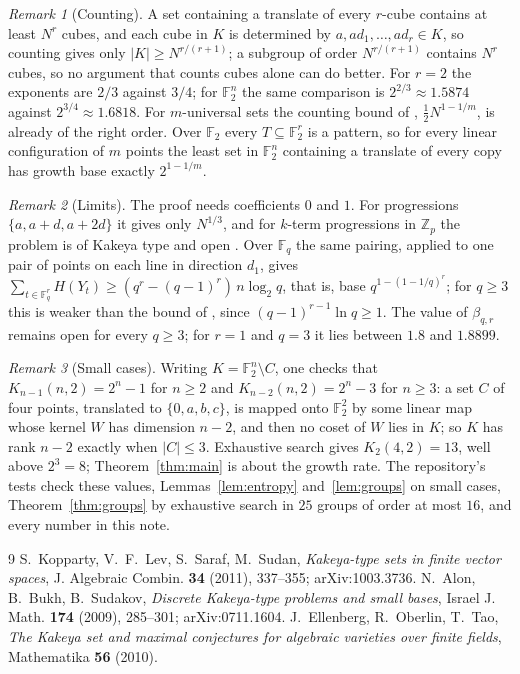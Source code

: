 \documentclass[11pt]{amsart}
\theoremstyle{remark}
\newtheorem*{remark}{Remark}
\newcommand{\F}{\mathbb{F}}
\begin{document}
\begin{remark}[Counting]
A set containing a translate of every $r$-cube contains at least $N^r$ cubes, and each cube in
$K$ is determined by $a,ad_1,\dots,ad_r\in K$, so counting gives only $|K|\ge N^{r/(r+1)}$; a
subgroup of order $N^{r/(r+1)}$ contains $N^r$ cubes, so no argument that counts cubes alone can
do better. For $r=2$ the exponents are $2/3$ against $3/4$; for $\F_2^n$ the same comparison is
$2^{2/3}\approx1.5874$ against $2^{3/4}\approx1.6818$. For $m$-universal sets the counting bound of
\cite{ABS}, $\tfrac12N^{1-1/m}$, is already of the right order. Over $\F_2$ every $T\subseteq\F_2^r$
is a pattern, so for every linear configuration of $m$ points the least set in $\F_2^n$
containing a translate of every copy has growth base exactly $2^{1-1/m}$.
\end{remark}

\begin{remark}[Limits]
The proof needs coefficients $0$ and $1$. For progressions $\{a,a+d,a+2d\}$ it gives only
$N^{1/3}$, and for $k$-term progressions in $\mathbb Z_p$ the problem is of Kakeya type and open
\cite{ABS}. Over $\F_q$ the same pairing, applied to one pair of points on each line in direction
$d_1$, gives $\sum_{t\in\F_q^r}H(Y_t)\ge(q^r-(q-1)^r)\,n\log_2q$, that is, base
$q^{1-(1-1/q)^r}$; for $q\ge3$ this is weaker than the bound of \cite{KLSS}, since
$(q-1)^{r-1}\ln q\ge1$. The value of $\beta_{q,r}$ remains open for every $q\ge3$; for $r=1$ and
$q=3$ it lies between $1.8$ and $1.8899$.
\end{remark}

\begin{remark}[Small cases]
Writing $K=\F_2^n\setminus C$, one checks that $K_{n-1}(n,2)=2^n-1$ for $n\ge2$ and
$K_{n-2}(n,2)=2^n-3$ for $n\ge3$: a set $C$ of four points, translated to $\{0,a,b,c\}$, is mapped
onto $\F_2^2$ by some linear map whose kernel $W$ has dimension $n-2$, and then no coset of $W$
lies in $K$; so $K$ has rank $n-2$ exactly when $|C|\le3$. Exhaustive search gives $K_2(4,2)=13$, well above
$2^{3}=8$; Theorem~\ref{thm:main} is about the growth rate. The repository's tests check these
values, Lemmas~\ref{lem:entropy} and~\ref{lem:groups} on small cases, Theorem~\ref{thm:groups} by
exhaustive search in $25$ groups of order at most $16$, and every number in this note.
\end{remark}

\begin{thebibliography}{9}
 S.~Kopparty, V.~F.~Lev, S.~Saraf, M.~Sudan, \emph{Kakeya-type sets in finite
vector spaces}, J. Algebraic Combin. \textbf{34} (2011), 337--355; arXiv:1003.3736.
 N.~Alon, B.~Bukh, B.~Sudakov, \emph{Discrete Kakeya-type problems and small bases},
Israel J. Math. \textbf{174} (2009), 285--301; arXiv:0711.1604.
 J.~Ellenberg, R.~Oberlin, T.~Tao, \emph{The Kakeya set and maximal conjectures for
algebraic varieties over finite fields}, Mathematika \textbf{56} (2010).
\end{thebibliography}
\end{document}
